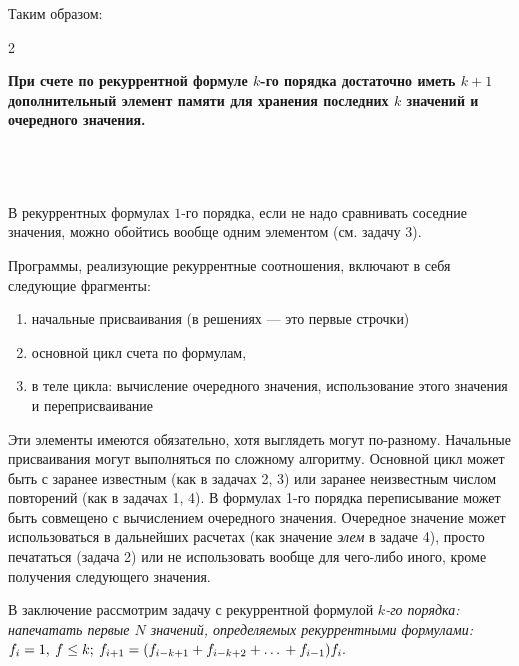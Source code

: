 \newline

\justifying
\noindent \newline Таким образом:
\begin{multicols}{2} 

	\hspace{2em}\begin{minipage}{0.8\linewidth}
		\hspace{2em}\small\textbf{При счете по рекуррентной формуле $k$-го порядка достаточно иметь $k+1$ дополнительный элемент памяти для хранения последних $k$ значений и очередного значения.}
	\end{minipage}
\\ \\ \\
\indent В рекуррентных формулах $1$-го порядка, если не надо сравнивать соседние значения, можно обойтись вообще одним элементом (см. задачу 3).

\hspace{2em} Программы, реализующие рекуррентные соотношения, включают в себя следующие фрагменты:
	\begin{enumerate}[label=—,wide=0pt,itemindent = 2em]
		\item начальные присваивания (в решениях — это первые строчки)
		\item основной цикл счета по формулам, 
		\item в теле цикла: вычисление очередного значения, использование этого значения и переприсваивание 
	\end{enumerate} 
\hspace{2em} Эти элементы имеются обязательно, хотя выглядеть могут по-разному. Начальные присваивания могут выполняться по сложному алгоритму. Основной цикл может быть с заранее известным (как в задачах 2, 3) или заранее неизвестным числом повторений (как в задачах 1, 4). В формулах 1-го порядка переписывание может быть совмещено с вычислением очередного значения. Очередное значение может использоваться в дальнейших расчетах (как значение \textit{элем} в задаче 4), просто печататься (задача 2) или не использовать вообще для чего-либо иного, кроме получения следующего значения.

\hspace{2em} В заключение рассмотрим задачу с рекуррентной формулой \textit{$k$-го порядка: напечатать первые $N$ значений, определяемых рекуррентными формулами:}\\

$f_i = 1, \: f \le k; \: f_{i+1} = (f_{i-k+1} + f_{i-k+2} + \dots\vphantom + + f_{i-1})f_i. $\\[-6pt]


\end{multicols}
